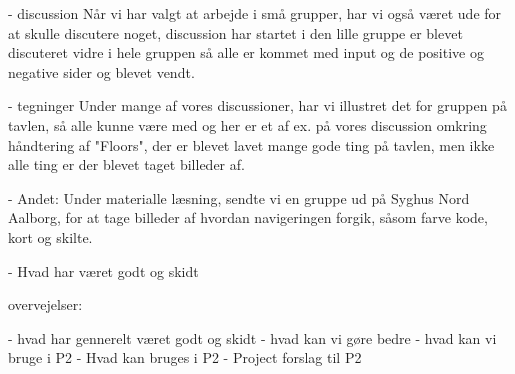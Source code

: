 - discussion
Når vi har valgt at arbejde i små grupper, har vi også været ude for at skulle discutere noget, discussion har startet i den lille gruppe er blevet  discuteret vidre i hele gruppen så alle er  kommet med input og de positive og negative sider og blevet vendt. 
 
- tegninger
Under mange af vores discussioner, har vi illustret det for gruppen på tavlen, så alle kunne være  med og her er et af ex. på vores discussion omkring håndtering af "Floors", der er blevet lavet mange gode ting på tavlen, men ikke alle ting er der blevet taget billeder af.

- Andet:
Under materialle læsning, sendte vi en gruppe ud på Syghus Nord Aalborg,  for at  tage billeder af hvordan navigeringen forgik, såsom farve kode, kort og skilte. 

- Hvad har været godt og skidt

overvejelser:

- hvad har gennerelt været godt og skidt
- hvad kan vi gøre bedre
- hvad kan vi bruge i P2
- Hvad kan bruges i P2
- Project  forslag til P2
